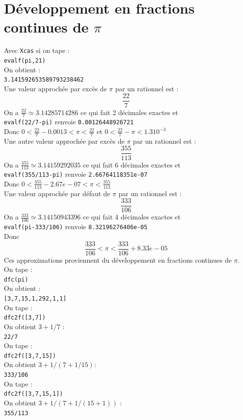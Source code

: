 \documentclass[a4paper,11pt]{book}
\begin{document}
\section{D\'eveloppement en fractions continues de $\pi$}
Avec {\tt Xcas} si on tape :\\
{\tt evalf(pi,21)}\\
On obtient :\\
{\tt 3.141592653589793238462}\\
Une valeur approch\'ee par exc\`es de $\pi$ par un rationnel est : 
$$\frac{22}{7}$$
On a $\frac{22}{7}\simeq 3.14285714286$ ce qui fait 2 d\'ecimales exactes et\\
{\tt evalf(22/7-pi)} renvoie {\tt 0.00126448926721}\\
Donc $0<\frac{22}{7}-0.0013<\pi<\frac{22}{7}$ et $0<\frac{22}{7}-\pi<1.310^{-3}$\\

Une autre valeur approch\'ee par exc\`es de $\pi$ par un rationnel est : 
$$\frac{355}{113}$$
On a $\frac{355}{113}\simeq 3.14159292035$ ce qui fait 6 d\'ecimales exactes et\\
{\tt evalf(355/113-pi)} renvoie {\tt 2.66764118351e-07}\\
Donc $0<\frac{355}{113}-2.67e-07<\pi<\frac{355}{113}$\\
Une  valeur approch\'ee par d\'efaut de $\pi$ par un rationnel est : 
$$\frac{333}{106}$$
On a $\frac{333}{106}\simeq 3.14150943396$ ce qui fait 4 d\'ecimales exactes 
et\\
{\tt evalf(pi-333/106)} renvoie {\tt 8.32196276406e-05}\\
Donc $$\frac{333}{106}<\pi<\frac{333}{106}+8.33e-05$$
Ces approximations proviennent du d\'eveloppement en fractions continues de 
$\pi$.\\
On tape :\\
{\tt dfc(pi)}\\
On obtient :\\
{\tt [3,7,15,1,292,1,1]}\\
On tape :\\
{\tt dfc2f([3,7])}\\
On obtient $3+1/7$ :\\
{\tt 22/7}\\
On tape :\\
{\tt dfc2f([3,7,15])}\\
On obtient $3+1/(7+1/15)$:\\
{\tt 333/106}\\
On tape :\\
{\tt dfc2f([3,7,15,1])}\\
On obtient $3+1/(7+1/(15+1))$ :\\
{\tt 355/113}\\
\end{document}
